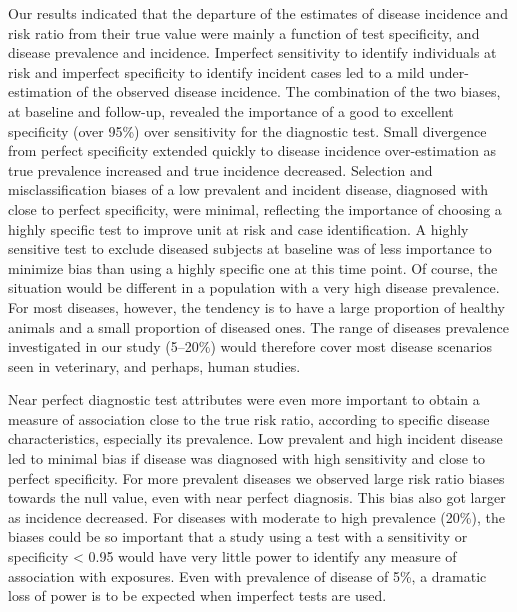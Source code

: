 Our results indicated that the departure of the estimates of disease incidence
and risk ratio from their true value were mainly a function of test specificity,
and disease prevalence and incidence.
Imperfect sensitivity to identify individuals at risk and imperfect
specificity to identify incident cases led to a mild under-estimation of the
observed disease incidence.
The combination of the two biases, at baseline and follow-up, revealed the
importance of a good to excellent specificity (over 95\%) over sensitivity for
the diagnostic test.
Small divergence from perfect specificity extended quickly to disease
incidence over-estimation as true prevalence increased and true incidence
decreased.
Selection and misclassification biases of a low prevalent and incident
disease, diagnosed with close to perfect specificity, were minimal, reflecting
the importance of choosing a highly specific test to improve unit at risk and
case identification.
A highly sensitive test to exclude diseased subjects at baseline was of less
importance to minimize bias than using a highly specific one at this time point.
Of course, the situation would be different in a population with a very high
disease prevalence.
For most diseases, however, the tendency is to have a large proportion of
healthy animals and a small proportion of diseased ones.
The range of diseases prevalence investigated in our study (5--20\%) would
therefore cover most disease scenarios seen in veterinary, and perhaps, human
studies.

Near perfect diagnostic test attributes were even more important to obtain a
measure of association close to the true risk ratio, according to specific
disease characteristics, especially its prevalence.
Low prevalent and high incident disease led to minimal bias if disease was
diagnosed with high sensitivity and close to perfect specificity.
For more prevalent diseases we observed large risk ratio biases towards the
null value, even with near perfect diagnosis.
This bias also got larger as incidence decreased.
For diseases with moderate to high prevalence (20\%), the biases could be so
important that a study using a test with a sensitivity or specificity < 0.95
would have very little power to identify any measure of association with
exposures.
Even with prevalence of disease of 5\%, a dramatic loss of power is to be
expected when imperfect tests are used.


